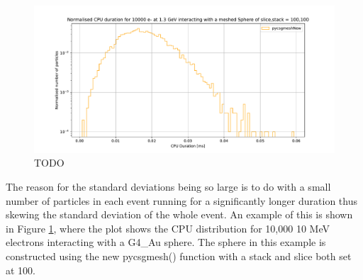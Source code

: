 \documentclass[12pt,a4paper]{article}
\begin{document}

\begin{figure}[h!]
\centering
\includegraphics[scale=0.5]{Images//CPU//pythonhist1.pdf}
\caption[width=\columnwidth]{TODO}
\label{disty}
\end{figure}


\noindent The reason for the standard deviations being so large is to do with a small number of particles in each event running for a significantly longer duration  thus skewing the standard deviation of the whole event. An example of this is shown in Figure \ref{disty}, where the plot shows the CPU distribution for 10,000 10 MeV electrons interacting with a G4\_Au sphere. The sphere in this example is constructed using the new pycsgmesh() function with a stack and slice both set at 100.
\end{document}
